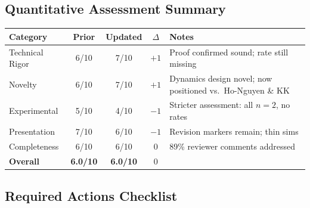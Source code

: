 \documentclass[journal,twoside,web]{ieeecolor}
\begin{document}
\subsection*{Quantitative Assessment Summary}

\begin{tabular}{lcccp{4.5cm}}
\hline
\textbf{Category} & \textbf{Prior} & \textbf{Updated} & \textbf{$\Delta$} & \textbf{Notes} \\
\hline
Technical Rigor & 6/10 & 7/10 & $+1$ & Proof confirmed sound; rate still missing \\
Novelty & 6/10 & 7/10 & $+1$ & Dynamics design novel; now positioned vs.\ Ho-Nguyen \& KK \\
Experimental & 5/10 & 4/10 & $-1$ & Stricter assessment: all $n{=}2$, no rates \\
Presentation & 7/10 & 6/10 & $-1$ & Revision markers remain; thin sims \\
Completeness & 6/10 & 6/10 & $0$ & 89\% reviewer comments addressed \\
\hline
\textbf{Overall} & \textbf{6.0/10} & \textbf{6.0/10} & $0$ & \\
\hline
\end{tabular}

\subsection*{Required Actions Checklist}
\end{document}
